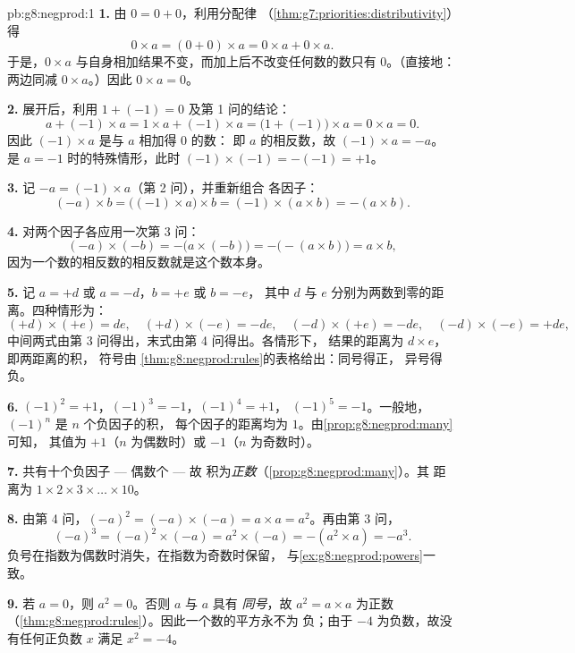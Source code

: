 \begin{solution}{pb:g8:negprod:1}
\textbf{1.} 由 $0 = 0 + 0$，利用分配律
（\cref{thm:g7:priorities:distributivity}）得
\[
0 \times a = (0 + 0) \times a = 0 \times a + 0 \times a .
\]
于是，$0 \times a$ 与自身相加结果不变，而加上后不改变任何数的数只有
$0$。（直接地：
两边同减 $0 \times a$。）因此 $0 \times a = 0$。

\textbf{2.} 展开后，利用 $1 + (-1) = 0$ 及第 1 问的结论：
\[
a + (-1) \times a
= 1 \times a + (-1) \times a
= \bigl(1 + (-1)\bigr) \times a
= 0 \times a = 0 .
\]
因此 $(-1) \times a$ 是与 $a$ 相加得 $0$ 的数：
即 $a$ 的相反数，故 $(-1) \times a = -a$。
 是 $a = -1$ 时的特殊情形，此时
$(-1) \times (-1) = -(-1) = +1$。

\textbf{3.} 记 $-a = (-1) \times a$（第 2 问），并重新组合
各因子：
\[
(-a) \times b
= \bigl((-1) \times a\bigr) \times b
= (-1) \times (a \times b)
= -(a \times b) .
\]

\textbf{4.} 对两个因子各应用一次第 3 问：
\[
(-a) \times (-b)
= -\bigl(a \times (-b)\bigr)
= -\bigl(-(a \times b)\bigr)
= a \times b ,
\]
因为一个数的相反数的相反数就是这个数本身。

\textbf{5.} 记 $a = +d$ 或 $a = -d$，$b = +e$ 或 $b = -e$，
其中 $d$ 与 $e$ 分别为两数到零的距离。四种情形为：
\[
(+d) \times (+e) = de, \quad
(+d) \times (-e) = -de, \quad
(-d) \times (+e) = -de, \quad
(-d) \times (-e) = +de,
\]
中间两式由第 3 问得出，末式由第 4 问得出。各情形下，
结果的距离为 $d \times e$，即两距离的积，
符号由
\cref{thm:g8:negprod:rules}的表格给出：同号得正，
异号得负。

\textbf{6.} $(-1)^2 = +1$，$(-1)^3 = -1$，$(-1)^4 = +1$，
$(-1)^5 = -1$。一般地，$(-1)^n$ 是 $n$ 个负因子的积，
每个因子的距离均为 $1$。由\cref{prop:g8:negprod:many}可知，
其值为 $+1$（$n$ 为偶数时）或 $-1$（$n$ 为奇数时）。

\textbf{7.} 共有十个负因子 --- 偶数个 --- 故
积为\emph{正数}（\cref{prop:g8:negprod:many}）。其
距离为 $1 \times 2 \times 3 \times \dots \times 10$。

\textbf{8.} 由第 4 问，$(-a)^2 = (-a) \times (-a) = a \times a =
a^2$。再由第 3 问，
\[
(-a)^3 = (-a)^2 \times (-a) = a^2 \times (-a) = -(a^2 \times a)
= -a^3 .
\]
负号在指数为偶数时消失，在指数为奇数时保留，
与\cref{ex:g8:negprod:powers}一致。

\textbf{9.} 若 $a = 0$，则 $a^2 = 0$。否则 $a$ 与 $a$ 具有
\emph{同号}，故 $a^2 = a \times a$ 为正数
（\cref{thm:g8:negprod:rules}）。因此一个数的平方永不为
负；由于 $-4$ 为负数，故没有任何正负数 $x$ 满足
$x^2 = -4$。


\end{solution}
